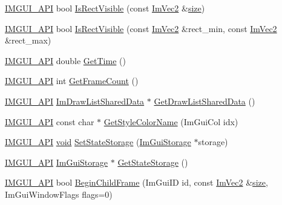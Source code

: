 \begin{DoxyCompactItemize}
\item 
\hyperlink{imgui_8h_a43829975e84e45d1149597467a14bbf5}{I\+M\+G\+U\+I\+\_\+\+A\+PI} bool \hyperlink{namespaceImGui_a578ead6237b3ed05497ed361f18d9f97}{Is\+Rect\+Visible} (const \hyperlink{structImVec2}{Im\+Vec2} \&\hyperlink{imgui__impl__opengl3__loader_8h_a3d1e3edfcf61ca2d831883e1afbad89e}{size})
\item 
\hyperlink{imgui_8h_a43829975e84e45d1149597467a14bbf5}{I\+M\+G\+U\+I\+\_\+\+A\+PI} bool \hyperlink{namespaceImGui_a5aca7e6939e07caaca489aa8c776fd81}{Is\+Rect\+Visible} (const \hyperlink{structImVec2}{Im\+Vec2} \&rect\+\_\+min, const \hyperlink{structImVec2}{Im\+Vec2} \&rect\+\_\+max)
\item 
\hyperlink{imgui_8h_a43829975e84e45d1149597467a14bbf5}{I\+M\+G\+U\+I\+\_\+\+A\+PI} double \hyperlink{namespaceImGui_a3f983cf463367c8fd3a3d5793639dc59}{Get\+Time} ()
\item 
\hyperlink{imgui_8h_a43829975e84e45d1149597467a14bbf5}{I\+M\+G\+U\+I\+\_\+\+A\+PI} int \hyperlink{namespaceImGui_a0180211f23fc10807dfc3d2f6e8681f9}{Get\+Frame\+Count} ()
\item 
\hyperlink{imgui_8h_a43829975e84e45d1149597467a14bbf5}{I\+M\+G\+U\+I\+\_\+\+A\+PI} \hyperlink{structImDrawListSharedData}{Im\+Draw\+List\+Shared\+Data} $\ast$ \hyperlink{namespaceImGui_a2a5a77bd5b6215e8cb47a8a457224a52}{Get\+Draw\+List\+Shared\+Data} ()
\item 
\hyperlink{imgui_8h_a43829975e84e45d1149597467a14bbf5}{I\+M\+G\+U\+I\+\_\+\+A\+PI} const char $\ast$ \hyperlink{namespaceImGui_a265d7614c4c0b92ba6dd43946a3293e0}{Get\+Style\+Color\+Name} (Im\+Gui\+Col idx)
\item 
\hyperlink{imgui_8h_a43829975e84e45d1149597467a14bbf5}{I\+M\+G\+U\+I\+\_\+\+A\+PI} \hyperlink{imgui__impl__opengl3__loader_8h_ac668e7cffd9e2e9cfee428b9b2f34fa7}{void} \hyperlink{namespaceImGui_a5ba1bf82e3ecdd09dcb6ad733bcf5726}{Set\+State\+Storage} (\hyperlink{structImGuiStorage}{Im\+Gui\+Storage} $\ast$storage)
\item 
\hyperlink{imgui_8h_a43829975e84e45d1149597467a14bbf5}{I\+M\+G\+U\+I\+\_\+\+A\+PI} \hyperlink{structImGuiStorage}{Im\+Gui\+Storage} $\ast$ \hyperlink{namespaceImGui_aa2b8fa1a5320cd70f23a53d8fe604fb2}{Get\+State\+Storage} ()
\item 
\hyperlink{imgui_8h_a43829975e84e45d1149597467a14bbf5}{I\+M\+G\+U\+I\+\_\+\+A\+PI} bool \hyperlink{namespaceImGui_a0565e1ef69c897b1f30f37f95dd787f1}{Begin\+Child\+Frame} (Im\+Gui\+ID id, const \hyperlink{structImVec2}{Im\+Vec2} \&\hyperlink{imgui__impl__opengl3__loader_8h_a3d1e3edfcf61ca2d831883e1afbad89e}{size}, Im\+Gui\+Window\+Flags flags=0)

\end{DoxyCompactItemize}
